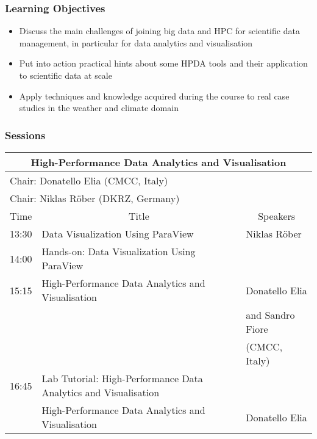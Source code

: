 \subsubsection{Learning Objectives}

\begin{itemize}

\item Discuss the main challenges of joining big data and HPC for scientific data management, in particular for data analytics and visualisation
\item Put into action practical hints about some HPDA tools and their application to scientific data at scale
\item Apply techniques and knowledge acquired during the course to real case studies in the weather and climate domain

\end{itemize}

\subsubsection{Sessions}

\begin{table}[H]
\begin{center}
\begin{tabular}{|l|l|l|}
\hline
\multicolumn{3}{|c|}{\textbf{High-Performance Data Analytics and Visualisation}} \\ \hline
\multicolumn{3}{|l|}{Chair: Donatello Elia (CMCC, Italy)} \\
\multicolumn{3}{|l|}{Chair: Niklas Röber (DKRZ, Germany)} \\ \hline \hline
Time & \multicolumn{1}{c|}{Title} & \multicolumn{1}{c|}{Speakers} \\ \hline \hline
13:30 & Data Visualization Using ParaView & Niklas Röber \\ \hline
14:00 & Hands-on: Data Visualization Using ParaView & \\ \hline
15:15 & High-Performance Data Analytics and Visualisation & Donatello Elia \\
      &                                                   & and Sandro Fiore \\
      &                                                   & (CMCC, Italy) \\ \hline
16:45 & Lab Tutorial: High-Performance Data Analytics and Visualisation & \\ \hline
      & High-Performance Data Analytics and Visualisation & Donatello Elia \\ \hline
\hline
\end{tabular}
\end{center}
\end{table}

